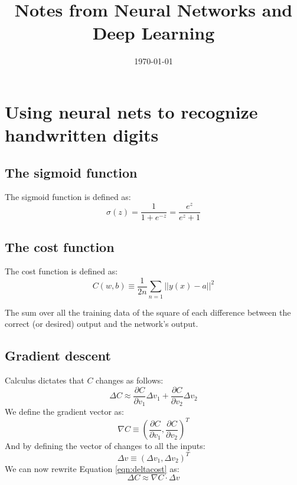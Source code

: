 \documentclass[11pt]{article}
\date{\today}
\title{Notes from Neural Networks and Deep Learning}
\begin{document}
\maketitle


\section{Using neural nets to recognize handwritten digits}
\label{sec:org4412943}
\subsection{The sigmoid function}
\label{sec:org0d0aa86}
The sigmoid function is defined as:
\begin{equation} \label{eqn:sigmoid}
\sigma(z) = \frac{1}{1 + e^{-z}} = \frac{e^z}{e^z + 1}
\end{equation}

\subsection{The cost function}
\label{sec:org327224b}
The cost function is defined as:
\begin{equation} \label{eqn:cost}
C(w,b) \equiv \frac{1}{2n} \sum_{n=1} ||y(x) - a||^2
\end{equation}

The sum over all the training data of the square of each difference between the correct (or desired) output
and the network's output.

\subsection{Gradient descent}
\label{sec:org21f95f3}
Calculus dictates that \(C\) changes as follows:
\begin{equation} \label{eqn:deltacost}
\Delta C \approx \frac{\partial C}{\partial v_1} \Delta v_1 + \frac{\partial C}{\partial v_2} \Delta v_2
\end{equation}
We define the gradient vector as:
\begin{equation}
\nabla C \equiv (\frac{\partial C}{\partial v_1}, \frac{\partial C}{\partial v_2})^T
\end{equation}
And by defining the vector of changes to all the inputs:
\begin{equation}
\Delta v \equiv (\Delta v_1, \Delta v_2)^T
\end{equation}
We can now rewrite Equation \ref{eqn:deltacost} as:
\begin{equation} \label{eqn:deltacostconcise}
\Delta C \approx \nabla C \cdot \Delta v
\end{equation}
\end{document}
